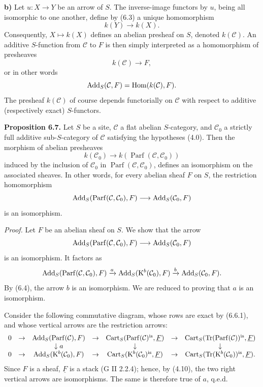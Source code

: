 \documentclass[11pt]{article}
\newcommand{\Parf}{\operatorname{Parf}}
\begin{document}
\textbf{b)} Let \(u:X\to Y\) be an arrow of \(S\). The inverse-image functors by \(u\), being all isomorphic to one another, define by (6.3) a unique homomorphism
\[
  k(Y)\longrightarrow k(X).
\]
Consequently, \(X\mapsto k(X)\) defines an abelian presheaf on \(S\), denoted \(k(\mathcal C)\). An additive \(S\)-function from \(\mathcal C\) to \(F\) is then simply interpreted as a homomorphism of presheaves
\[
  k(\mathcal C)\longrightarrow F,
\]
or in other words
\[
  \operatorname{Add}_S(\mathcal C,F)=\operatorname{Hom}(k(\mathcal C),F).
\]
The presheaf \(k(\mathcal C)\) of course depends functorially on \(\mathcal C\) with respect to additive (respectively exact) \(S\)-functors.

\textbf{Proposition 6.7.} Let \(S\) be a site, \(\mathcal C\) a flat abelian \(S\)-category, and \(\mathcal C_0\) a strictly full additive sub-\(S\)-category of \(\mathcal C\) satisfying the hypotheses (4.0). Then the morphism of abelian presheaves
\[
  k(\mathcal C_0)\longrightarrow k(\Parf(\mathcal C,\mathcal C_0))
\]
induced by the inclusion of \(\mathcal C_0\) in \(\Parf(\mathcal C,\mathcal C_0)\), defines an isomorphism on the associated sheaves. In other words, for every abelian sheaf \(F\) on \(S\), the restriction homomorphism
\[
  \Add_S(\Parf(\mathcal C,\mathcal C_0),F)
  \longrightarrow
  \Add_S(\mathcal C_0,F)
\]
is an isomorphism.

\emph{Proof.} Let \(F\) be an abelian sheaf on \(S\). We show that the arrow
\[
  \Add_S(\Parf(\mathcal C,\mathcal C_0),F)
  \longrightarrow
  \Add_S(\mathcal C_0,F)
\]
is an isomorphism. It factors as
\[
\Add_S(\Parf(\mathcal C,\mathcal C_0),F)
 \xrightarrow{a}
\Add_S(\Kpx^b(\mathcal C_0),F)
 \xrightarrow{b}
\Add_S(\mathcal C_0,F).
\]
By (6.4), the arrow \(b\) is an isomorphism. We are reduced to proving that \(a\) is an isomorphism.

Consider the following commutative diagram, whose rows are exact by (6.6.1), and whose vertical arrows are the restriction arrows:
\[
\begin{array}{ccccccccc}
0&\to&\Add_S(\Parf(\mathcal C),F)&\to&\Cart_S(\Parf(\mathcal C)^{\is},\underline F)&\to&\Cart_S(\Tr(\Parf(\mathcal C))^{\is},\underline F)\\
&&\downarrow a&&\downarrow&&\downarrow\\
0&\to&\Add_S(\Kpx^b(\mathcal C_0),F)&\to&\Cart_S(\Kpx^b(\mathcal C_0)^{\is},\underline F)&\to&\Cart_S(\Tr(\Kpx^b(\mathcal C_0))^{\is},\underline F).
\end{array}
\]
Since \(F\) is a sheaf, \(\underline F\) is a stack (G II 2.2.4); hence, by (4.10), the two right vertical arrows are isomorphisms. The same is therefore true of \(a\), q.e.d.
\end{document}

